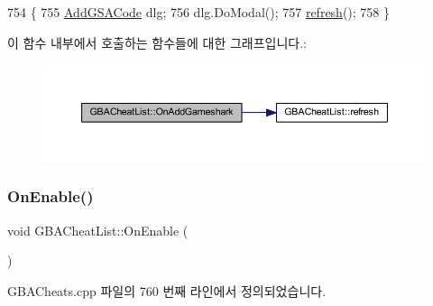 \begin{DoxyCode}
754 \{
755   \mbox{\hyperlink{class_add_g_s_a_code}{AddGSACode}} dlg;
756   dlg.DoModal();
757   \mbox{\hyperlink{class_g_b_a_cheat_list_a12928bb674926ae02d5a3ceb156a3b53}{refresh}}();
758 \}
\end{DoxyCode}
이 함수 내부에서 호출하는 함수들에 대한 그래프입니다.\+:
\nopagebreak
\begin{figure}[H]
\begin{center}
\leavevmode
\includegraphics[width=350pt]{class_g_b_a_cheat_list_acd2892992a12237aa208dbfe53331da2_cgraph}
\end{center}
\end{figure}
\mbox{\label{class_g_b_a_cheat_list_a22de639a60de7c74ffd176281df51b14}} 
\subsubsection{\texorpdfstring{On\+Enable()}{OnEnable()}}
{\footnotesize\ttfamily void G\+B\+A\+Cheat\+List\+::\+On\+Enable (\begin{DoxyParamCaption}{ }\end{DoxyParamCaption})\hspace{0.3cm}{\ttfamily [protected]}}



G\+B\+A\+Cheats.\+cpp 파일의 760 번째 라인에서 정의되었습니다.


